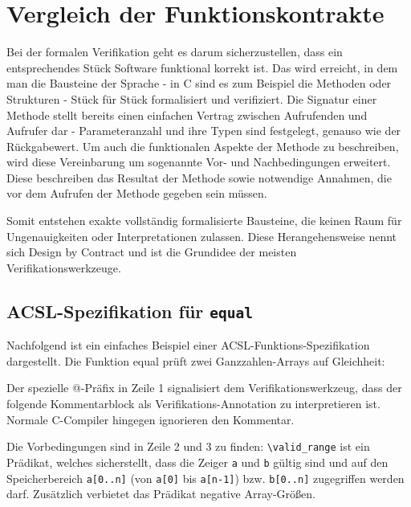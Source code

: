 ﻿\chapter{Vergleich der Funktionskontrakte}
\label{sec:design-by-contract}

Bei der formalen Verifikation geht es darum sicherzustellen, dass ein entsprechendes Stück Software
funktional korrekt ist. Das wird erreicht, in dem man die Bausteine der Sprache - in C sind es zum Beispiel die Methoden 
oder Strukturen -
Stück für Stück formalisiert und verifiziert. Die Signatur einer Methode stellt bereits einen einfachen Vertrag zwischen
Aufrufenden und Aufrufer dar - Parameteranzahl und ihre Typen sind festgelegt, genauso wie der Rückgabewert.
Um auch die funktionalen Aspekte der Methode zu beschreiben, wird diese Vereinbarung um sogenannte Vor- und Nachbedingungen erweitert.
Diese beschreiben das Resultat der Methode sowie notwendige Annahmen, die vor dem Aufrufen der Methode gegeben sein müssen. 

Somit entstehen exakte vollständig formalisierte Bausteine, die keinen Raum für Ungenauigkeiten oder Interpretationen zulassen.
Diese Herangehensweise nennt sich Design by Contract und ist die Grundidee der meisten Verifikationswerkzeuge.


\section{ACSL-Spezifikation für \texttt{equal}}
\label{sec:design-by-contract:acsl-spezifikation}

Nachfolgend ist ein einfaches Beispiel einer ACSL-Funktions-Spezifikation dargestellt.
Die Funktion equal prüft zwei Ganzzahlen-Arrays auf Gleichheit:


Der spezielle @-Präfix in Zeile 1 signalisiert dem Verifikationswerkzeug, 
dass der folgende Kommentarblock als Verifikations-Annotation zu interpretieren ist. Normale C-Compiler hingegen
ignorieren den Kommentar.

Die Vorbedingungen sind in Zeile 2 und 3 zu finden: \lstinline{\valid_range} ist ein Prädikat, welches sicherstellt,
dass die Zeiger \lstinline{a} und \lstinline{b} gültig sind und auf den Speicherbereich \lstinline{a[0..n]} 
(von \lstinline{a[0]} bis \lstinline{a[n-1]}) bzw. \lstinline{b[0..n]} zugegriffen 
werden darf. Zusätzlich verbietet das Prädikat negative Array-Größen.


